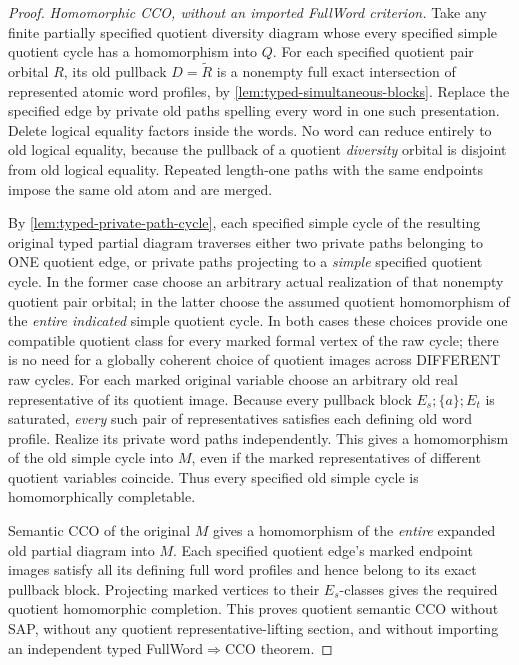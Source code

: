 \begin{proof}
\emph{Homomorphic CCO, without an imported FullWord criterion.}
Take any finite partially specified quotient diversity diagram
whose every specified simple quotient cycle has a homomorphism
into $Q$.  For each specified quotient pair orbital $R$, its
old pullback $D=\widetilde R$ is a nonempty full exact
intersection of represented atomic word profiles, by
\cref{lem:typed-simultaneous-blocks}.  Replace the specified
edge by private old paths spelling every word in one such
presentation.  Delete logical equality factors inside the
words.  No word can reduce entirely to old logical equality,
because the pullback of a quotient \emph{diversity} orbital is
disjoint from old logical equality.  Repeated length-one paths
with the same endpoints impose the same old atom and are merged.

By \cref{lem:typed-private-path-cycle}, each specified
simple cycle of the resulting original typed partial diagram
traverses either two private paths belonging to ONE quotient
edge, or private paths projecting to a \emph{simple} specified
quotient cycle. In the former case choose an arbitrary actual
realization of that nonempty quotient pair orbital; in the
latter choose the assumed quotient homomorphism of the
\emph{entire indicated} simple quotient cycle. In both
cases these choices provide one compatible quotient class
for every marked formal vertex of the raw cycle; there is
no need for a globally coherent choice of quotient images
across DIFFERENT raw cycles.
For each marked original variable choose an arbitrary old real
representative of its quotient image.  Because every pullback
block $E_s;\{a\};E_t$ is saturated, \emph{every} such pair of
representatives satisfies each defining old word profile.
Realize its private word paths independently.  This gives a
homomorphism of the old simple cycle into $M$, even if the
marked representatives of different quotient variables
coincide.  Thus every specified old simple cycle is
homomorphically completable.

Semantic CCO of the original $M$ gives a homomorphism of the
\emph{entire} expanded old partial diagram into $M$.  Each
specified quotient edge's marked endpoint images satisfy
all its defining full word profiles and hence belong to its
exact pullback block.  Projecting marked vertices to their
$E_s$-classes gives the required quotient homomorphic
completion.  This proves quotient semantic CCO without SAP,
without any quotient representative-lifting section, and
without importing an independent typed FullWord$\Rightarrow$CCO
theorem.
\end{proof}


